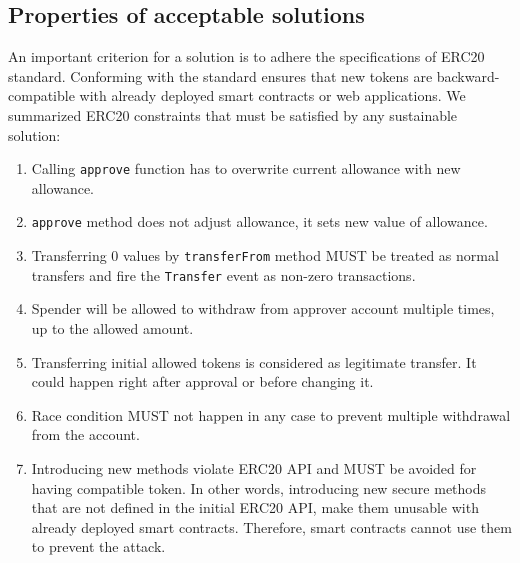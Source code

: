 \subsection{Properties of acceptable solutions}
An important criterion for a solution is to adhere the specifications of ERC20 standard. Conforming with the standard ensures that new tokens are backward-compatible with already deployed smart contracts or web applications. We summarized ERC20 constraints \cite{Ref08} that must be satisfied by any sustainable solution:


\begin{enumerate}
	\item Calling \texttt{approve} function has to overwrite current allowance with new allowance.
	\item \texttt{approve} method does not adjust allowance, it sets new value of allowance.
	\item Transferring 0 values by \texttt{transferFrom} method MUST be treated as normal transfers and fire the \texttt{Transfer} event as non-zero transactions.
	\item Spender will be allowed to withdraw from approver account multiple times, up to the allowed amount.
	\item Transferring initial allowed tokens is considered as legitimate transfer. It could happen right after approval or before changing it.
	\item Race condition MUST not happen in any case to prevent multiple withdrawal from the account.
	\item Introducing new methods violate ERC20 API and MUST be avoided for having compatible token. In other words, introducing new secure methods that are not defined in the initial ERC20 API, make them unusable with already deployed smart contracts. Therefore, smart contracts cannot use them to prevent the attack.
\end{enumerate}